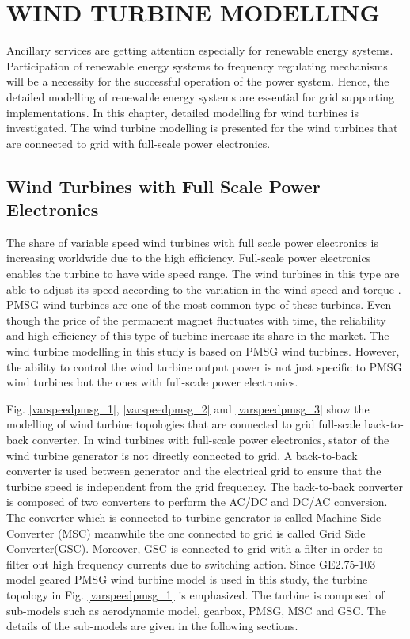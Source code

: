 \chapter{WIND TURBINE MODELLING}
\label{chp:3}
Ancillary services are getting attention especially for renewable energy systems. Participation of renewable energy systems to frequency regulating mechanisms will be a necessity for the successful operation of the power system. Hence, the detailed modelling of renewable energy systems are essential for grid supporting implementations. In this chapter, detailed modelling for wind turbines is investigated. The wind turbine modelling is presented for the wind turbines that are connected to grid with full-scale power electronics. 
\section{Wind Turbines with Full Scale Power Electronics}
The share of variable speed wind turbines with full scale power electronics is increasing worldwide due to the high efficiency. Full-scale power electronics enables the turbine to have wide speed range. The wind turbines in this type are able to adjust its speed according to the variation in the wind speed and torque \cite{Chen2009b}. PMSG wind turbines are one of the most common type of these turbines. Even though the price of the permanent magnet fluctuates with time, the reliability and high efficiency of this type of turbine increase its share in the market. The wind turbine modelling in this study is based on PMSG wind turbines. However, the ability to control the wind turbine output power is not just specific to PMSG wind turbines but the ones with full-scale power electronics. \par
Fig. \ref{varspeedpmsg_1}, \ref{varspeedpmsg_2} and \ref{varspeedpmsg_3} show the modelling of wind turbine topologies that are connected to grid full-scale back-to-back converter. In wind turbines with full-scale power electronics, stator of the wind turbine generator is not directly connected to grid. A back-to-back converter is used between generator and the electrical grid to ensure that the turbine speed is independent from the grid frequency. The back-to-back converter is composed of two converters to perform the AC/DC and DC/AC conversion. The converter which is connected to turbine generator is called Machine Side Converter (MSC) meanwhile the one connected to grid is called Grid Side Converter(GSC). Moreover, GSC is connected to grid with a filter in order to filter out high frequency currents due to switching action. Since GE2.75-103 model geared PMSG wind turbine model is used in this study, the turbine topology in Fig. \ref{varspeedpmsg_1} is emphasized. The turbine is composed of sub-models such as aerodynamic model, gearbox, PMSG, MSC and GSC. The details of the sub-models are given in the following sections.\par

